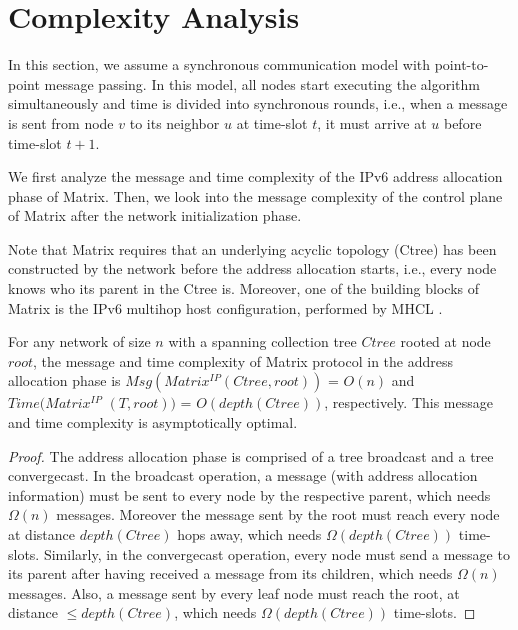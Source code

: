 \section{Complexity Analysis}\label{sec:analysis}

In this section, we assume a synchronous communication model with
point-to-point message passing. In this model, all nodes start
executing the algorithm simultaneously and time is divided into
synchronous rounds, i.e., when a message is sent from node $v$ to
its neighbor $u$ at time-slot $t$, it must arrive at $u$ before
time-slot $t+1$.

We first analyze the message and time complexity of the IPv6 address
allocation phase of Matrix. Then, we look into the message
complexity of the control plane of Matrix after the network
initialization phase.

Note that Matrix requires that an underlying acyclic topology (Ctree) has
been constructed by the network before the address allocation starts, i.e.,
every node knows who its parent in the Ctree is.
Moreover, one of the building blocks of Matrix is the IPv6 multihop host
configuration, performed by MHCL \cite{2016techreport}.


\begin{theorem} \cite{2016techreport} For any network of size $n$ with a
spanning collection tree $Ctree$ rooted at node $root$, the message and time
complexity of Matrix protocol in the address allocation phase is
$Msg(Matrix^{IP}(Ctree, root))$ = $O(n)$ and $Time(Matrix^{IP}$ $(T, root))$
= $O(depth(Ctree))$, respectively. This message and time complexity is
asymptotically optimal.
\end{theorem}
\begin{proof}
The address allocation phase is comprised of a tree broadcast and a tree
convergecast.
In the broadcast operation, a message (with address allocation information) must be
sent to every node by the respective parent, which needs $\Omega(n)$ messages.
Moreover the message sent by the root must reach every node at distance
$depth(Ctree)$ hops away, which needs $\Omega(depth(Ctree))$ time-slots.
Similarly, in the convergecast operation, every node must send a message to its
parent after having received a message from its children, which needs
$\Omega(n)$ messages. Also, a message sent by every leaf node must reach the
root, at distance $\leq depth(Ctree)$, which needs $\Omega(depth(Ctree))$
time-slots.
\end{proof}


